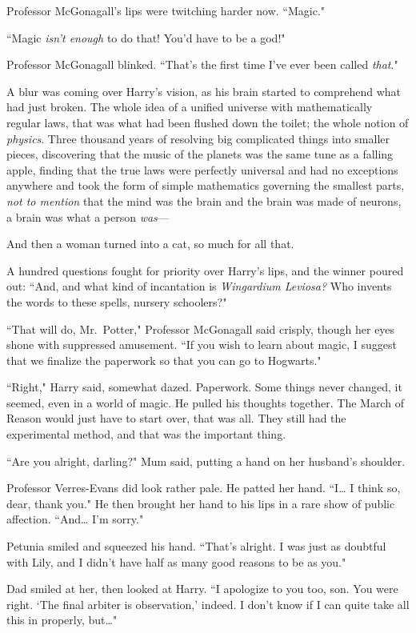 Professor McGonagall's lips were twitching harder now. ``Magic."

``Magic \emph{isn't enough} to do that! You'd have to be a god!"

Professor McGonagall blinked. ``That's the first time I've ever been called \emph{that}."

A blur was coming over Harry's vision, as his brain started to comprehend what had just broken. The whole idea of a unified universe with mathematically regular laws, that was what had been flushed down the toilet; the whole notion of \emph{physics}. Three thousand years of resolving big complicated things into smaller pieces, discovering that the music of the planets was the same tune as a falling apple, finding that the true laws were perfectly universal and had no exceptions anywhere and took the form of simple mathematics governing the smallest parts, \emph{not to mention} that the mind was the brain and the brain was made of neurons, a brain was what a person \emph{was}---

And then a woman turned into a cat, so much for all that.

A hundred questions fought for priority over Harry's lips, and the winner poured out: ``And, and what kind of incantation is \emph{Wingardium Leviosa?} Who invents the words to these spells, nursery schoolers?"

``That will do, Mr.~Potter," Professor McGonagall said crisply, though her eyes shone with suppressed amusement. ``If you wish to learn about magic, I suggest that we finalize the paperwork so that you can go to Hogwarts."

``Right," Harry said, somewhat dazed. Paperwork. Some things never changed, it seemed, even in a world of magic. He pulled his thoughts together. The March of Reason would just have to start over, that was all. They still had the experimental method, and that was the important thing.

``Are you alright, darling?" Mum said, putting a hand on her husband's shoulder.

Professor Verres-Evans did look rather pale. He patted her hand. ``I{\ldots} I think so, dear, thank you." He then brought her hand to his lips in a rare show of public affection. ``And{\ldots} I'm sorry."

Petunia smiled and squeezed his hand. ``That's alright. I was just as doubtful with Lily, and I didn't have half as many good reasons to be as you."

Dad smiled at her, then looked at Harry. ``I apologize to you too, son. You were right. `The final arbiter is observation,' indeed. I don't know if I can quite take all this in properly, but{\ldots}"

